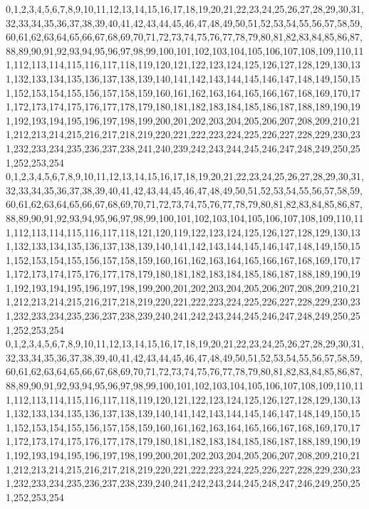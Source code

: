 \documentclass[12pt]{article}
\begin{document}
{0,1,2,3,4,5,6,7,8,9,10,11,12,13,14,15,16,17,18,19,20,21,22,23,24,25,26,27,28,29,30,31,32,33,34,35,36,37,38,39,40,41,42,43,44,45,46,47,48,49,50,51,52,53,54,55,56,57,58,59,60,61,62,63,64,65,66,67,68,69,70,71,72,73,74,75,76,77,78,79,80,81,82,83,84,85,86,87,88,89,90,91,92,93,94,95,96,97,98,99,100,101,102,103,104,105,106,107,108,109,110,111,112,113,114,115,116,117,118,119,120,121,122,123,124,125,126,127,128,129,130,131,132,133,134,135,136,137,138,139,140,141,142,143,144,145,146,147,148,149,150,151,152,153,154,155,156,157,158,159,160,161,162,163,164,165,166,167,168,169,170,171,172,173,174,175,176,177,178,179,180,181,182,183,184,185,186,187,188,189,190,191,192,193,194,195,196,197,198,199,200,201,202,203,204,205,206,207,208,209,210,211,212,213,214,215,216,217,218,219,220,221,222,223,224,225,226,227,228,229,230,231,232,233,234,235,236,237,238,241,240,239,242,243,244,245,246,247,248,249,250,251,252,253,254\\
0,1,2,3,4,5,6,7,8,9,10,11,12,13,14,15,16,17,18,19,20,21,22,23,24,25,26,27,28,29,30,31,32,33,34,35,36,37,38,39,40,41,42,43,44,45,46,47,48,49,50,51,52,53,54,55,56,57,58,59,60,61,62,63,64,65,66,67,68,69,70,71,72,73,74,75,76,77,78,79,80,81,82,83,84,85,86,87,88,89,90,91,92,93,94,95,96,97,98,99,100,101,102,103,104,105,106,107,108,109,110,111,112,113,114,115,116,117,118,121,120,119,122,123,124,125,126,127,128,129,130,131,132,133,134,135,136,137,138,139,140,141,142,143,144,145,146,147,148,149,150,151,152,153,154,155,156,157,158,159,160,161,162,163,164,165,166,167,168,169,170,171,172,173,174,175,176,177,178,179,180,181,182,183,184,185,186,187,188,189,190,191,192,193,194,195,196,197,198,199,200,201,202,203,204,205,206,207,208,209,210,211,212,213,214,215,216,217,218,219,220,221,222,223,224,225,226,227,228,229,230,231,232,233,234,235,236,237,238,239,240,241,242,243,244,245,246,247,248,249,250,251,252,253,254\\
0,1,2,3,4,5,6,7,8,9,10,11,12,13,14,15,16,17,18,19,20,21,22,23,24,25,26,27,28,29,30,31,32,33,34,35,36,37,38,39,40,41,42,43,44,45,46,47,48,49,50,51,52,53,54,55,56,57,58,59,60,61,62,63,64,65,66,67,68,69,70,71,72,73,74,75,76,77,78,79,80,81,82,83,84,85,86,87,88,89,90,91,92,93,94,95,96,97,98,99,100,101,102,103,104,105,106,107,108,109,110,111,112,113,114,115,116,117,118,119,120,121,122,123,124,125,126,127,128,129,130,131,132,133,134,135,136,137,138,139,140,141,142,143,144,145,146,147,148,149,150,151,152,153,154,155,156,157,158,159,160,161,162,163,164,165,166,167,168,169,170,171,172,173,174,175,176,177,178,179,180,181,182,183,184,185,186,187,188,189,190,191,192,193,194,195,196,197,198,199,200,201,202,203,204,205,206,207,208,209,210,211,212,213,214,215,216,217,218,219,220,221,222,223,224,225,226,227,228,229,230,231,232,233,234,235,236,237,238,239,240,241,242,243,244,245,248,247,246,249,250,251,252,253,254\\

}
\end{document}
